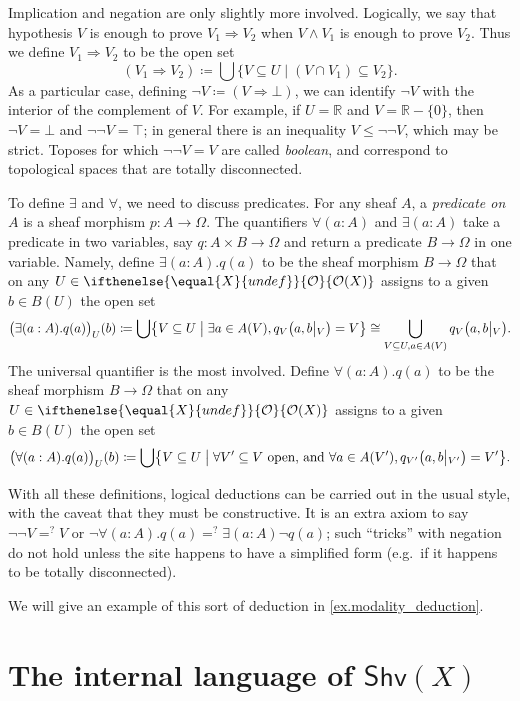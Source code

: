\documentclass[reqno,11pt]{amsproc}
\theoremstyle{plain}
\theoremstyle{definition}
\newcommand{\cat}[1]{\mathsf{#1}}
\renewcommand{\to}[1][]{\xrightarrow{#1}}
\newcommand{\tn}[1]{\textnormal{#1}}
\newcommand{\rr}{\mathbb{R}}
\newcommand{\shv}{\cat{Shv}}
\newcommand{\Op}[1][undef]{\ifthenelse{\equal{#1}{undef}}{\mathcal{O}}{\mathcal{O}(#1)}}
\newcommand{\rest}[2]{#1\big|\hspace{0in}_{#2}}
\newcommand{\imp}{\Rightarrow}
\let\originalleft\left
\let\originalright\right
\renewcommand{\left}{\mathopen{}\mathclose\bgroup\originalleft}
\renewcommand{\right}{\aftergroup\egroup\originalright}
\numberwithin{equation}{section}
\begin{document}
Implication and negation are only slightly more involved. Logically, we say that hypothesis $V$ is enough to prove $V_1\imp V_2$ when $V\wedge V_1$ is enough to prove $V_2$. Thus we define $V_1\imp V_2$ to be the open set
\begin{equation}\label{eqn.implication}
	(V_1\imp V_2)\coloneqq\bigcup\{V\subseteq U\mid (V\cap V_1)\subseteq V_2\}.
\end{equation}
 As a particular case, defining $\neg V\coloneqq (V\imp \bot)$, we can identify $\neg V$ with the interior of the complement of $V$. For example, if $U=\rr$ and $V=\rr-\{0\}$, then $\neg V=\bot$ and $\neg\neg V=\top$; in general there is an inequality $V\le\neg\neg V$, which may be strict. Toposes for which $\neg\neg V=V$ are called \emph{boolean}, and correspond to topological spaces that are totally disconnected.

To define $\exists$ and $\forall$, we need to discuss predicates. For any sheaf $A$, a \emph{predicate on $A$} is a sheaf morphism $p\colon A\to\Omega$. The quantifiers $\forall(a:A)$ and $\exists(a:A)$ take a predicate in two variables, say $q\colon A\times B\to\Omega$ and return a predicate $B\to\Omega$ in one variable. Namely, define $\exists(a:A).q(a)$ to be the sheaf morphism $B\to\Omega$ that on any $U\in\Op[X]$ assigns to a given $b\in B(U)$ the open set
\[
\big(\exists(a:A).q(a)\big)_U(b)\coloneqq\bigcup\left\{V\subseteq U\;\middle|\;\exists a\in A(V), q_V\big(a,\rest{b}{V}\big)=V\right\}\cong\bigcup_{V\subseteq U,a\in A(V)}q_V\big(a,\rest{b}{V}\big).
\]
The universal quantifier is the most involved. Define $\forall(a:A).q(a)$ to be the sheaf morphism $B\to\Omega$ that on any $U\in\Op[X]$ assigns to a given $b\in B(U)$ the open set
\[
\big(\forall(a:A).q(a)\big)_U(b)\coloneqq\bigcup\left\{V\subseteq U\;\middle|\;
\forall V'\subseteq V \tn{ open, and } \forall a\in A(V'), q_{V'}\big(a,\rest{b}{V'}\big)=V'\right\}.
\]

With all these definitions, logical deductions can be carried out in the usual style, with the caveat that they must be constructive. It is an extra axiom to say $\neg\neg V=^?V$ or $\neg\forall (a:A).q(a) =^? \exists (a:A)\neg q(a)$; such ``tricks'' with negation do not hold unless the site happens to have a simplified form (e.g.\ if it happens to be totally disconnected).

We will give an example of this sort of deduction in \cref{ex.modality_deduction}.

\section{The internal language of $\shv(X)$}\label{sec.internal_language}
\end{document}
